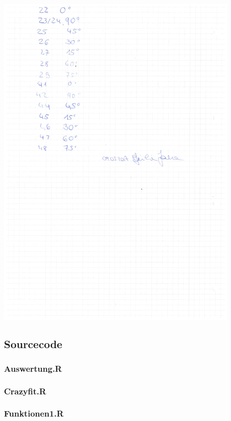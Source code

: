 \begin{minipage}{\textwidth}
	\centering
	\includegraphics[width=0.9\textwidth]{../figures/Laborbuch2Holo.pdf}
\end{minipage}

\subsection{Sourcecode}
\label{code}
\subsubsection*{Auswertung.R}

\subsubsection*{Crazyfit.R}

\subsubsection*{Funktionen1.R}


